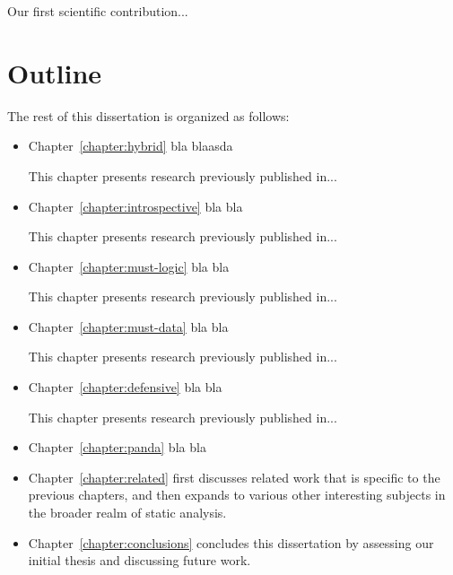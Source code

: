 Our first scientific contribution...


\section{Outline}

The rest of this dissertation is organized as follows:
\begin{itemize}%
\item Chapter~\ref{chapter:hybrid} bla blaasda

    This chapter presents research previously published in...

\item Chapter~\ref{chapter:introspective} bla bla

    This chapter presents research previously published in...

\item Chapter~\ref{chapter:must-logic} bla bla

    This chapter presents research previously published in...

\item Chapter~\ref{chapter:must-data} bla bla

    This chapter presents research previously published in...

\item Chapter~\ref{chapter:defensive} bla bla

    This chapter presents research previously published in...
    
\item Chapter~\ref{chapter:panda} bla bla

\item Chapter~\ref{chapter:related} first discusses related work that
  is specific to the previous chapters, and then expands to various
  other interesting subjects in the broader realm of static analysis.

\item Chapter~\ref{chapter:conclusions} concludes this dissertation by assessing our initial thesis and discussing future work.
\end{itemize}